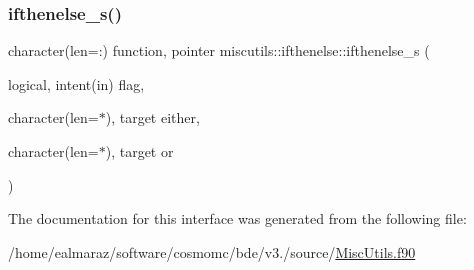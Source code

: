 \mbox{\label{interfacemiscutils_1_1ifthenelse_a3491a4415c681f89c9a6a181a12d21c5}} 
\subsubsection{\texorpdfstring{ifthenelse\+\_\+s()}{ifthenelse\_s()}}
{\footnotesize\ttfamily character(len=\+:) function, pointer miscutils\+::ifthenelse\+::ifthenelse\+\_\+s (\begin{DoxyParamCaption}\item[{logical, intent(in)}]{flag,  }\item[{character(len=$\ast$), target}]{either,  }\item[{character(len=$\ast$), target}]{or }\end{DoxyParamCaption})}



The documentation for this interface was generated from the following file\+:\begin{DoxyCompactItemize}
\item 
/home/ealmaraz/software/cosmomc/bde/v3./source/\mbox{\hyperlink{MiscUtils_8f90}{Misc\+Utils.\+f90}}\end{DoxyCompactItemize}
